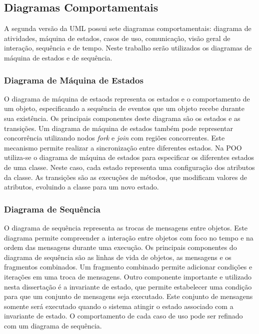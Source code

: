\subsection{Diagramas Comportamentais}

A segunda versão da UML possui sete diagramas comportamentais: diagrama de atividades, máquina de estados, casos de uso, comunicação, visão geral de 
interação, sequência e de tempo. Neste trabalho serão utilizados os diagramas de máquina de estados e de sequência.

\subsubsection{Diagrama de Máquina de Estados}

O diagrama de máquina de estaods representa os estados e o comportamento de um objeto, especificando a sequência de eventos que um objeto recebe
durante sua existência. Os principais componentes deste diagrama são os estados e as transições. Um diagrama de máquina de estados também pode
representar concorrência utilizando nodos \textit{fork} e \textit{join} com regiões concorrentes. Este mecanismo permite realizar a sincronização
entre diferentes estados. Na POO utiliza-se o diagrama de máquina de estados para especificar os diferentes estados de uma classe.
Neste caso, cada estado representa uma configuração dos atributos da classe. As transições são as execuções de métodos, que modificam valores de
atributos, evoluindo a classe para um novo estado.

\subsubsection{Diagrama de Sequência}

O diagrama de sequência representa as trocas de mensagens entre objetos. Este diagrama permite compreender a interação entre objetos com
foco no tempo e na ordem das mensagens durante uma execução. Os principais componentes do diagrama de sequência são as linhas de vida de objetos, as
mensagens e os fragmentos combinados. Um fragmento combinado permite adicionar condições e iterações em uma troca de mensagens. Outro componente
importante e utilizado nesta dissertação é a invariante de estado, que permite estabelecer uma condição para que um conjunto de mensagens seja
executado. Este conjunto de mensagens somente será executado quando o sistema atingir o estado associado com a invariante de estado. O comportamento
de cada caso de uso pode ser refinado com um diagrama de sequência.

